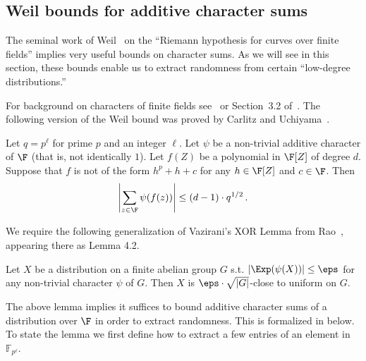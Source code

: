 \subsection{Weil bounds for additive character sums}\label{subsec:weil}
The seminal work of Weil~\cite{Weil48} on the ``Riemann hypothesis for
curves over finite fields'' implies very useful bounds on character
sums. As we will see in this section, these bounds enable us to
extract randomness from certain ``low-degree distributions.''

 For background on characters of finite fields see~\cite{Schmidt76} or Section~3.2 of~\cite{GR08}.
The following version of the Weil bound was proved by Carlitz and Uchiyama~\cite{CU57}.
\begin{theorem}\label{thm:weil_additive}
Let $q=p^{\ell}$ for prime $p$ and an integer $\ell$.
Let $\psi$ be a non-trivial additive character of $\F$ (that is,
not identically $1$). Let $f(Z)$ be a polynomial in $\F[Z]$ of
degree $d$. Suppose that $f$ is not of the form $h^p + h + c$ for any $h\in \F[Z]$ and $c\in \F$.
 Then
\[\left|\sum_{z\in \F} \psi(f(z))\right| \leq (d-1)\cdot q^{1/2}\,.\]
\end{theorem}

We require the following generalization of Vazirani's XOR Lemma from Rao~\cite{Rao07}, appearing there as Lemma 4.2.
\begin{lemma} \label{lem-rao}
Let $X$ be a distribution on a finite abelian group $G$ s.t.
$|\Exp(\psi(X))|\leq \eps$ for any non-trivial character
$\psi$ of $G$. Then $X$ is $\eps \cdot \sqrt {|G|}$-close to
uniform on $G$.
\end{lemma}

The above lemma implies it suffices to bound additive character sums of a distribution over $\F$ in order to extract randomness. This is formalized in  below. To state the lemma we first define how to extract a few entries of an element in $\mathbb{F}_{p^\ell}$.

